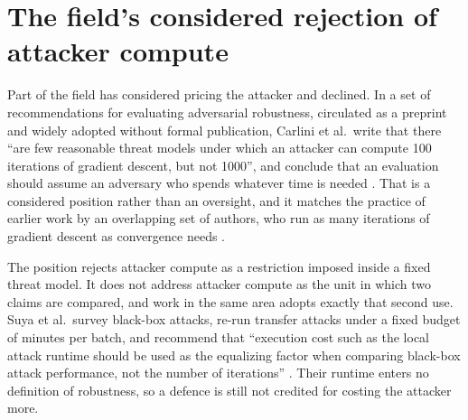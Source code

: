 \section{The field's considered rejection of attacker compute}
\label{sec:findings}

Part of the field has considered pricing the attacker and declined. In a set of
recommendations for evaluating adversarial robustness, circulated as a preprint and
widely adopted without formal publication, Carlini et al.\ write that
there ``are few reasonable threat models under which an attacker can compute 100
iterations of gradient descent, but not 1000'', and conclude that an evaluation
should assume an adversary who spends whatever time is needed \cite{CAPBRTGMK19}.
That is a considered position rather than an oversight, and it matches the
practice of earlier work by an overlapping set of authors, who run as many
iterations of gradient descent as convergence needs \cite{ACW18}.

The position rejects attacker compute as a restriction imposed inside a fixed
threat model. It does not address attacker compute as the unit in which two claims
are compared, and work in the same area adopts exactly that second use. Suya et
al.\ survey \BBattacks{} black-box attacks, re-run \BBrerun{} transfer attacks under
a fixed budget of \BBminutes{} minutes per batch, and recommend that ``execution cost such as the local attack runtime should be used as the
equalizing factor when comparing black-box attack performance, not the number of
iterations'' \cite{SSZHTE24}. Their runtime enters no definition of robustness, so
a defence is still not credited for costing the attacker more.
